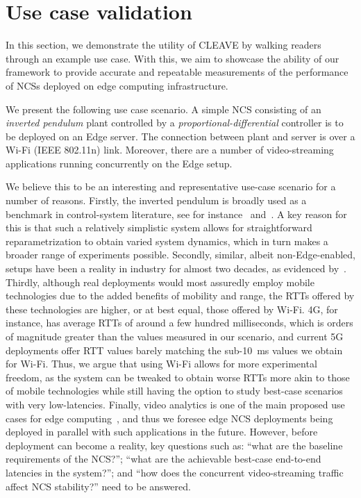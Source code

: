 \section{Use case validation}\label{paper:olguinmunoz2022cleave:experiments}

In this section, we demonstrate the utility of \gls{CLEAVE} by walking readers through an example use case.
With this, we aim to showcase the ability of our framework to provide accurate and repeatable measurements of the performance of \glspl{NCS} deployed on edge computing infrastructure.

We present the following use case scenario.
A simple \gls{NCS} consisting of an \emph{inverted pendulum} plant controlled by a \emph{proportional-differential} controller is to be deployed on an Edge server.
The connection between plant and server is over a Wi-Fi (IEEE 802.11n) link.
Moreover, there are a number of video-streaming applications running concurrently on the Edge setup.

We believe this to be an interesting and representative use-case scenario for a number of reasons.
Firstly, the inverted pendulum is broadly used as a benchmark in control-system literature, see for instance\ \cite{baumann2018evaluating} and\ \cite{natale2004inverted}.
A key reason for this is that such a relatively simplistic system allows for straightforward reparametrization to obtain varied system dynamics, which in turn makes a broader range of experiments possible.
Secondly, similar, albeit non-Edge-enabled, setups have been a reality in industry for almost two decades, as evidenced by\ \cite{gupta2010networked}.
Thirdly, although real deployments would most assuredly employ mobile technologies due to the added benefits of mobility and range, the \glspl{RTT} offered by these technologies are higher, or at best equal, those offered by Wi-Fi.
4G, for instance, has average \glspl{RTT} of around a few hundred milliseconds, which is orders of magnitude greater than the values measured in our scenario, and current 5G deployments offer \gls{RTT} values barely matching the sub-\SI{10}{\milli\second} values we obtain for Wi-Fi.
Thus, we argue that using Wi-Fi allows for more experimental freedom, as the system can be tweaked to obtain worse \glspl{RTT} more akin to those of mobile technologies while still having the option to study best-case scenarios with very low-latencies.
Finally, video analytics is one of the main proposed use cases for edge computing~\cite{ananthanarayanan2017real,yi2017lavea,wang2018bandwidth}, and thus we foresee edge \gls{NCS} deployments being deployed in parallel with such applications in the future.
However, before deployment can become a reality, key questions such as: 
``what are the baseline requirements of the \gls{NCS}?'';
``what are the achievable best-case end-to-end latencies in the system?'';
and ``how does the concurrent video-streaming traffic affect \gls{NCS} stability?'' need to be answered.

